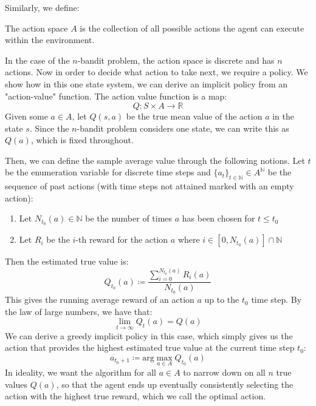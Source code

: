 \documentclass[Robotics.tex]{subfiles}
\begin{document}
Similarly, we define:
\begin{defn}
The action space $A$ is the collection of all possible actions the agent can execute within the environment.
\end{defn}
In the case of the $n$-bandit problem, the action space is discrete and has $n$ actions. Now in order to decide what action to take next, we require a policy. We show how in this one state system,
we can derive an implicit policy from an "action-value" function. The action value function is a map:
\begin{equation*}
Q: S \times A \xrightarrow{} \mathbb{R}
\end{equation*}
Given some $a \in A$, let $Q(s, a)$ be the true mean value of the action $a$ in the state $s$. Since the $n$-bandit problem considers one state, we can write this as $Q(a)$, which is fixed throughout.

Then, we can define the sample average value through the following notions. Let $t$ be the enumeration variable for discrete time steps and $\{a_t\}_{t \in \mathbb{N}} \in A^\mathbb{N}$ be the sequence of past actions (with time steps not attained marked with an empty action):
\begin{enumerate}
\item Let $N_{t_0}(a) \in \mathbb{N}$ be the number of times $a$ has been chosen for $t \leqslant t_0$
\item Let $R_i$ be the $i$-th reward for the action $a$ where $i \in [0, N_{t_0}(a)] \cap \mathbb{N}$
\end{enumerate}
Then the estimated true value is:
\begin{equation*}
Q_{t_0}(a) \coloneq \frac{\sum_{i=0}^{N_{t_0}(a)}R_i(a)}{N_{t_0}(a)}
\end{equation*}
This gives the running average reward of an action $a$ up to the $t_0$ time step. By the law of large numbers, we have that:
\begin{equation*}
\lim_{t \xrightarrow{} \infty}Q_t(a) = Q(a)
\end{equation*}
We can derive a greedy implicit policy in this case, which simply gives us the action that provides the highest estimated true value at the current time step $t_0$:
\begin{equation*}
a_{t_0 + 1} \coloneq \text{arg}\max_{a \in A}Q_{t_0}(a)
\end{equation*}
In ideality, we want the algorithm for all $a \in A$ to narrow down on all $n$ true values $Q(a)$, so that the agent ends up eventually consistently selecting the action with the highest true reward, which we call the optimal action.
\end{document}
